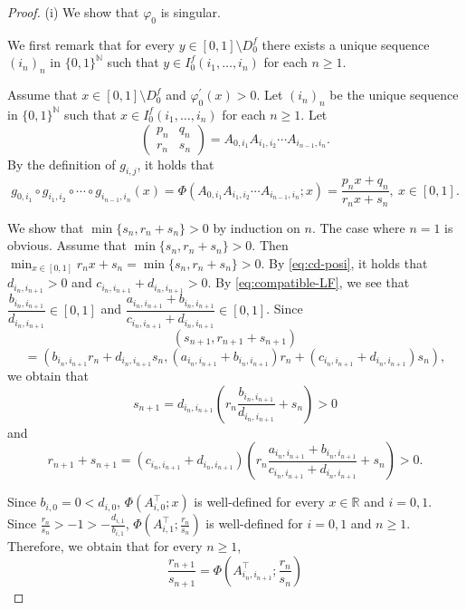 \documentclass[a4paper, reqno, 11pt]{amsart}
\theoremstyle{definition}
\begin{document}
\begin{proof}
(i) We show that $\varphi_0$ is singular. 

We first remark that  for every $y\in [0,1] \setminus D^{f}_0$ there exists a unique sequence $(i_n)_n$ in $\{0,1\}^{\mathbb N}$ such that $y \in I^{f}_{0} (i_1, \dots, i_n)$ for each $n \ge 1$. 

Assume that $x\in [0,1] \setminus D^{f}_0$ and $\varphi_0^{\prime}(x) > 0$.
Let $(i_n)_n$ be the unique sequence in $\{0,1\}^{\mathbb N}$ such that $x \in I^{f}_{0} (i_1, \dots, i_n)$ for each $n \ge 1$. 
Let 
\[ \begin{pmatrix} p_n & q_n \\  r_n & s_n \end{pmatrix} = A_{0,i_1} A_{i_1, i_2} \cdots A_{i_{n-1}, i_n}. \]
By the definition of $g_{i,j}$, it holds that 
\[ g_{0, i_1} \circ g_{i_1, i_2} \circ \cdots \circ g_{i_{n-1}, i_n} (x) = \Phi \left(A_{0,i_1} A_{i_1, i_2} \cdots A_{i_{n-1}, i_n}; x\right) = \frac{p_n x + q_n}{r_n x + s_n}, \ x \in [0,1]. \]

We show that $\min\{s_n, r_n + s_n\} > 0$ by induction on $n$. 
The case where $n=1$ is obvious. 
Assume that $\min\{s_n, r_n + s_n\} > 0$. 
Then $\displaystyle \min_{x \in [0,1]} r_n x + s_n = \min\{s_n, r_n + s_n\} > 0$. 
By \eqref{eq:cd-posi}, it holds that $d_{i_n, i_{n+1}} > 0$ and $c_{i_n, i_{n+1}} + d_{i_n, i_{n+1}} > 0$. 
By \eqref{eq:compatible-LF}, we see that 
$ \dfrac{b_{i_n, i_{n+1}}}{d_{i_n, i_{n+1}}} \in [0,1]$ and $\dfrac{a_{i_n, i_{n+1}} + b_{i_n, i_{n+1}}}{c_{i_n, i_{n+1}} + d_{i_n, i_{n+1}}}  \in [0,1]$. 
Since 
\[ (s_{n+1}, r_{n+1} + s_{n+1}) \]
\begin{equation}\label{eq:rs-iteration} 
 = \left(b_{i_n, i_{n+1}} r_{n} + d_{i_n, i_{n+1}} s_n,  (a_{i_n, i_{n+1}} + b_{i_n, i_{n+1}}) r_{n} + (c_{i_n, i_{n+1}} + d_{i_n, i_{n+1}}) s_n \right), 
\end{equation}
we obtain that 
\[ s_{n+1} = d_{i_n, i_{n+1}} \left(r_n \frac{b_{i_n, i_{n+1}}}{d_{i_n, i_{n+1}}} + s_n \right) > 0 \]
and 
\[ r_{n+1} + s_{n+1} = (c_{i_n, i_{n+1}} + d_{i_n, i_{n+1}}) \left(r_n \frac{a_{i_n, i_{n+1}} + b_{i_n, i_{n+1}}}{c_{i_n, i_{n+1}} + d_{i_n, i_{n+1}}} + s_n \right) > 0. \]

Since $b_{i,0} = 0 < d_{i,0}$, $ \Phi \left(A_{i, 0}^{\top} ; x\right)$ is well-defined for every $x \in \mathbb{R}$ and $i=0,1$. 
Since $\frac{r_n}{s_n} > -1 > -\frac{d_{i,1}}{b_{i,1}}$, $ \Phi \left(A_{i, 1}^{\top}; \frac{r_n}{s_n}\right)$ is well-defined for $i=0,1$ and $n \ge 1$. 
Therefore, we obtain that for every $n \ge 1$, 
\begin{equation}\label{eq:r-over-s} 
\frac{r_{n+1}}{s_{n+1}} = \Phi \left(A_{i_n, i_{n+1}}^{\top} ; \frac{r_n}{s_n} \right)
\end{equation}


\end{proof}
\end{document}
